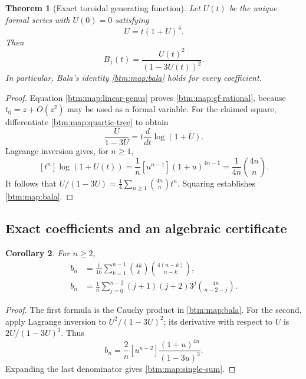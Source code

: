 \documentclass[11pt,letterpaper]{article}
\numberwithin{equation}{section}
\newtheorem{theorem}{Theorem}[section]
\newtheorem{corollary}[theorem]{Corollary}
\theoremstyle{definition}
\theoremstyle{remark}
\begin{document}
\begin{theorem}[Exact toroidal generating function]
 \label{btm:map:gf-theorem}
 Let $U(t)$ be the unique formal series with $U(0)=0$ satisfying
 \begin{equation}
  \label{btm:map:quartic-tree}
  U=t(1+U)^4.
 \end{equation}
 Then
 \begin{equation}
  \label{btm:map:gf-rational}
  B_1(t)=\frac{U(t)^2}{(1-3U(t))^2}.
 \end{equation}
 In particular, Bala's identity \eqref{btm:map:bala} holds for every
 coefficient.
\end{theorem}

\begin{proof}
Equation \eqref{btm:map:linear-genus} proves \eqref{btm:map:gf-rational}, because
$t_0=z+O(z^2)$ may be used as a formal variable.  For the claimed square,
differentiate \eqref{btm:map:quartic-tree} to obtain
\[
 \frac{U}{1-3U}=t\frac{d}{dt}\log(1+U).
\]
Lagrange inversion gives, for $n\geq1$,
\[
 [t^n]\log(1+U(t))
 =\frac1n[u^{n-1}](1+u)^{4n-1}
 =\frac{1}{4n}\binom{4n}{n}.
\]
It follows that $U/(1-3U)=\frac14\sum_{n\geq1}\binom{4n}{n}t^n$.
Squaring establishes \eqref{btm:map:bala}.
\end{proof}

\subsection{Exact coefficients and an algebraic certificate}
\label{btm:map:coefficients}

\begin{corollary}
 \label{btm:map:finite-formulas}
 For $n\geq2$,
 \begin{align}
  b_n&=\frac1{16}\sum_{k=1}^{n-1}
        \binom{4k}{k}\binom{4(n-k)}{n-k},
       \label{btm:map:convolution}\\
  b_n&=\frac1n\sum_{j=0}^{n-2}(j+1)(j+2)3^j
        \binom{4n}{n-2-j}.
       \label{btm:map:single-sum}
 \end{align}
\end{corollary}

\begin{proof}
The first formula is the Cauchy product in \eqref{btm:map:bala}.  For the
second, apply Lagrange inversion to $U^2/(1-3U)^2$; its derivative with
respect to $U$ is $2U/(1-3U)^3$.  Thus
\[
 b_n=\frac2n[u^{n-2}]\frac{(1+u)^{4n}}{(1-3u)^3}.
\]
Expanding the last denominator gives \eqref{btm:map:single-sum}.
\end{proof}
\end{document}
